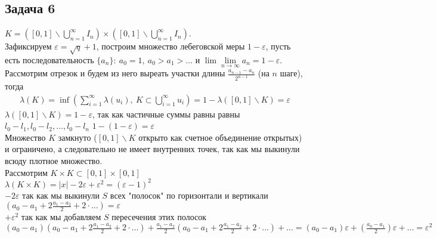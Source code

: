 \subsection*{Задача 6}
	$K = ([0,1] \backslash \bigcup\limits_{n=1}^{\infty} I_n) \times ([0,1] \backslash \bigcup\limits_{n=1}^{\infty} I_n)$.\\
	Зафиксируем $\varepsilon = \sqrt{q} + 1$, построим множество лебеговской меры $1 - \varepsilon$, пусть есть последовательность $\{a_n\}:\ a_0 = 1,\ a_0 > a_1 > \ldots$ и $\lim\lim\limits_{n \to \infty} a_n = 1 - \varepsilon$. Рассмотрим отрезок и будем из него выреать участки длины $\frac{a_{n-1} - a_{n}}{2^{n-1}}$ (на $n$ шаге), тогда
	\begin{gather*}
		\lambda(K) = \inf(\sum\limits_{i=1}^{\infty} \lambda(u_i),\ K \subset \bigcup\limits_{i=1}^{\infty} u_i) = 1 - \lambda([0,1]\backslash K) = \varepsilon
	\end{gather*}
	$\lambda([0,1] \backslash K) = 1 - \varepsilon$, так как частичные суммы равны равны $l_0-l_1, l_0-l_2, \ldots, l_0-l_n$ $1-(1-\varepsilon) = \varepsilon$\\
	Множество $K$ замкнуто ($[0,1]\backslash K$ открыто как счетное объединение открытых) и ограничено, а следовательно не имеет внутренних точек, так как мы выкинули всюду плотное множество.\\
	Рассмотрим $K \times K \subset [0,1] \times [0,1]$\\
	$\lambda(K \times K) = |x| - 2 \varepsilon + \varepsilon^2 = (\varepsilon - 1)^2$\\
	$-2\varepsilon$ так как мы выкинули $S$ всех "полосок" по горизонтали и вертикали $(a_0 - a_1 + 2 \frac{a_1 - a_2}{2} + 2 \cdot \ldots) = \varepsilon$\\
	$+\varepsilon^2$ так как мы добавляем $S$ пересечения этих полосок $(a_0 - a_1)(a_0 - a_1 + 2 \frac{a_1 - a_2}{2} + 2 \cdot \ldots) + \frac{a_1-a_2}{2}(a_0 - a_1 + 2 \frac{a_1 - a_2}{2} + 2 \cdot \ldots) + \ldots = (a_0 - a_1) \varepsilon + (\frac{a_0 - a_1}{2})\varepsilon + \ldots = \varepsilon^2$


